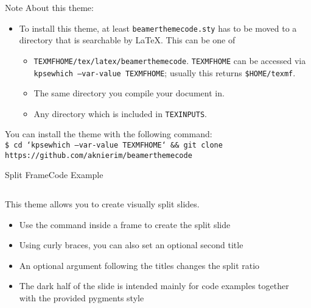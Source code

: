 \begin{frame}{Note}
  About this theme:
  \begin{itemize}
    \item To install this theme, at least \texttt{beamerthemecode.sty} has to be moved to a directory that is searchable by \LaTeX.
      This can be one of
      \begin{itemize}
        \item \texttt{TEXMFHOME/tex/latex/beamerthemecode}. \texttt{TEXMFHOME} can be accessed via \texttt{kpsewhich --var-value TEXMFHOME};
          usually this returns \texttt{\$HOME/texmf}.
        \item The same directory you compile your document in.
        \item Any directory which is included in \texttt{TEXINPUTS}.
      \end{itemize}
  \end{itemize}

  You can install the theme with the following command:\\
  \texttt{\footnotesize\$ cd `kpsewhich --var-value TEXMFHOME` \&\& git clone https://github.com/aknierim/beamerthemecode}
\end{frame}


\begin{splitframe}[fragile]{Split Frame}{Code Example}
  \begin{columns}[t]
    \begin{column}{0.58\textwidth}
      This theme allows you to create visually split slides.
      \begin{itemize}
        \setlength{\itemsep}{1em}
        \item Use the \texttt{\splitframe} command inside a frame
          to create the split slide
        \item Using curly braces, you can also set an optional second title
        \item An optional argument following the titles changes the split ratio
        \item The dark half of the slide is intended mainly for code
          examples together with the provided pygments style
      \end{itemize}
    \end{column}
    \hfill
    \begin{column}{0.38\textwidth}
      \footnotesize
      \color{cwhite}
      \inputminted{latex}{content/example_split_frame.tex}
    \end{column}
  \end{columns}
\end{splitframe}

